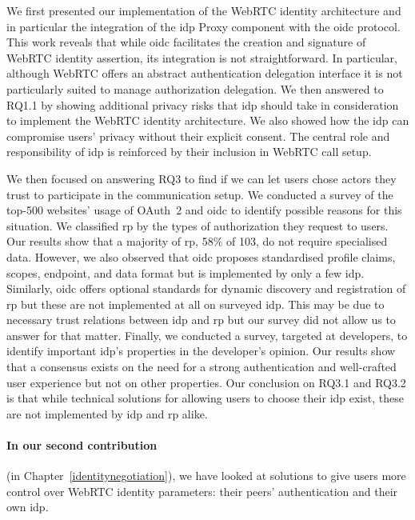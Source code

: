 We first presented our implementation of the WebRTC identity architecture and in particular the integration of the \gls{idp} Proxy component with the \gls{oidc} protocol.
This work reveals that while \gls{oidc} facilitates the creation and signature of WebRTC identity assertion, its integration is not straightforward.
In particular, although WebRTC offers an abstract authentication delegation interface it is not particularly suited to manage authorization delegation.
We then answered to RQ1.1 by showing additional privacy risks that \gls{idp} should take in consideration to implement the WebRTC identity architecture.
We also showed how the \gls{idp} can compromise users' privacy without their explicit consent.
The central role and responsibility of \gls{idp} is reinforced by their inclusion in WebRTC call setup.

We then focused on answering RQ3 to find if we can let users chose actors they trust to participate in the communication setup.
We conducted a survey of the top-500 websites' usage of OAuth~2 and \gls{oidc} to identify possible reasons for this situation.
We classified \gls{rp} by the types of authorization they request to users.
Our results show that a majority of \gls{rp}, 58\% of 103, do not require specialised data.
However, we also observed that \gls{oidc} proposes standardised profile claims, scopes, endpoint, and data format but is implemented by only a few \gls{idp}.
Similarly, \gls{oidc} offers optional standards for dynamic discovery and registration of \gls{rp} but these are not implemented at all on surveyed \gls{idp}.
This may be due to necessary trust relations between \gls{idp} and \gls{rp} but our survey did not allow us to answer for that matter.
Finally, we conducted a survey, targeted at developers, to identify important \gls{idp}'s properties in the developer's opinion.
Our results show that a consensus exists on the need for a strong authentication and well-crafted user experience but not on other properties.
Our conclusion on RQ3.1 and RQ3.2 is that while technical solutions for allowing users to choose their \gls{idp} exist, these are not implemented by \gls{idp} and \gls{rp} alike.

\paragraph{In our second contribution} (in Chapter~\ref{identitynegotiation}), we have looked at solutions to give users more control over WebRTC identity parameters: their peers' authentication and their own \gls{idp}.

